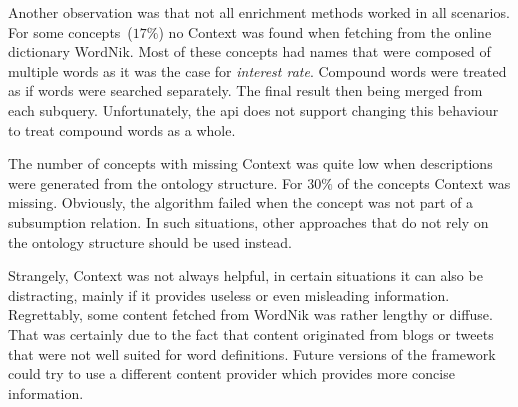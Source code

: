 Another observation was that not all enrichment methods worked in all scenarios.
For some concepts~($17\%$) no Context was found when fetching from the online dictionary WordNik. Most of these concepts had names that were composed of multiple words as it was the case for \emph{interest rate}. Compound words were treated as if words were searched separately. The final result then being merged from each subquery. Unfortunately, the \gls{api} does not support changing this behaviour to treat compound words as a whole. 

The number of concepts with missing Context was quite low when descriptions were generated from the ontology structure. For $30\%$ of the concepts Context was missing. Obviously, the algorithm failed when the concept was not part of a subsumption relation. In such situations, other approaches that do not rely on the ontology structure should be used instead. 

Strangely, Context was not always helpful, in certain situations it can also be distracting, mainly if it provides useless or even misleading information. Regrettably, some content fetched from WordNik was rather lengthy or diffuse. That was certainly due to the fact that content originated from blogs or tweets that were not well suited for word definitions. Future versions of the framework could try to use a different content provider which provides more concise information.
